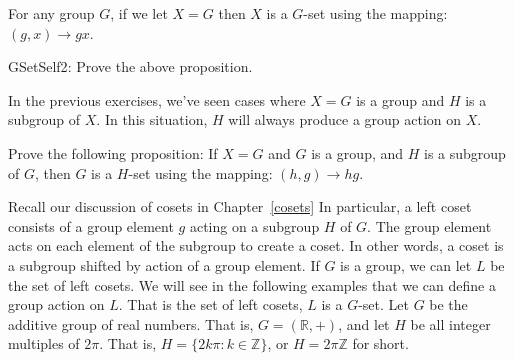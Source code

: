 \begin{prop}\label{proposition:actions:GSetSelf} 
For any group $G$, if we let $X=G$ then $X$ is a $G$-set using the mapping: $(g, x) \rightarrow  gx$.
\end{prop}

\begin {exercise}{GSetSelf2}: 
Prove the above proposition.
\end {exercise}
In the previous exercises, we've seen cases where $X=G$ is a group and $H$ is a subgroup of $X$.  In this situation, $H$ will always produce a group action on $X$.

\begin{exercise}\label{exercise:actions:HSet} 
Prove the following proposition:  If $X=G$ and $G$ is a group, and $H$ is a subgroup of $G$, then $G$ is a $H$-set using the mapping: $(h, g)\rightarrow hg$.
\end {exercise}

Recall our discussion of cosets in Chapter~\ref{cosets} In particular, a left coset consists of a group element $g$ acting on a subgroup $H$ of $G$. The group element acts on each element of the subgroup to create a coset. In other words, a coset is a subgroup shifted by action of a group element.  If $G$ is a group, we can let $L$ be the set of left cosets. We will see in the following examples that we can define a group action on $L$.  That is the set of left cosets, $L$ is a $G$-set.
Let $G$ be the additive group of real numbers.  That is, $G=(\mathbb{R},+)$, and let $H$ be all integer multiples of $2\pi$.   That is, $H=\{2k\pi:k\in \mathbb{Z}\}$, or $H = 2 \pi \mathbb{Z}$ for short.  

